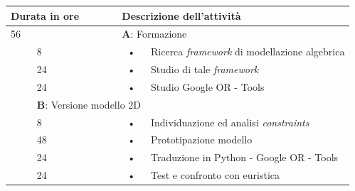 \begin{center}
	\begin{tabular}{|l|l|c l|}
		\hline
		\multicolumn{2}{|l|}{\textbf{Durata in ore}}		&	\multicolumn{2}{l|}{\textbf{Descrizione dell'attività}}\\
		\hline
		\multicolumn{2}{|l|}{56}	&	\multicolumn{2}{l|}{\textbf{A}: Formazione}\\
		\hline
		\multirow{5}{1cm}{ } & 8  & \hspace{5mm}•\hspace{2mm} & Ricerca \textit{framework} di modellazione algebrica \\
		\multirow{5}{1cm}{ } & 24 & \hspace{5mm}•\hspace{2mm} & Studio di tale \textit{framework}                    \\
		\multirow{5}{1cm}{ } & 24 & \hspace{5mm}•\hspace{2mm} & Studio Google OR - Tools                             \\
		\hline
																											
		\multicolumn{2}{|l|}{104}	&	\multicolumn{2}{l|}{\textbf{B}: Versione modello 2D}\\
		\hline
		\multirow{5}{1cm}{ } & 8  & \hspace{5mm}•\hspace{2mm} & Individuazione ed analisi \textit{constraints}       \\
		\multirow{3}{1cm}{ } & 48 & \hspace{5mm}•\hspace{2mm} & Prototipazione modello                               \\
		\multirow{5}{1cm}{ } & 24 & \hspace{5mm}•\hspace{2mm} & Traduzione in Python - Google OR - Tools             \\
		\multirow{5}{1cm}{ } & 24 & \hspace{5mm}•\hspace{2mm} & Test e confronto con euristica                       \\	
		\hline
																											

\end{tabular}
\end{center}
